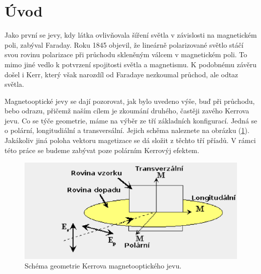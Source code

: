 \chapter*{Úvod}

Jako první se jevy, kdy látka ovlivňovala šíření světla v závislosti na magnetickém poli, zabýval Faraday. Roku 1845 objevil, že lineárně polarizované světlo stáčí svou rovinu polarizace při průchodu skleněným válcem v magnetickém poli. To mimo jiné vedlo k potvrzení spojitosti světla a magnetismu. K podobnému závěru došel i Kerr, který však narozdíl od Faradaye nezkoumal průchod, ale odtaz světla.

Magnetooptické jevy se dají pozorovat, jak bylo uvedeno výše, buď při průchodu, bebo odrazu, přičemž naším cílem je zkoumání druhého, častěji zavého Kerrova jevu. Co se týče geometrie, máme na výběr ze tří základních konfigurací. Jedná se o polární, longitudiální a transversální. Jejich schěma naleznete na obrázku (\ref{schema geo}). Jakákoliv jiná poloha vektoru magetizace se dá složit z těchto tří příadů. V rámci této práce se budeme zabývat poze polárním Kerrovýj efektem.

\begin{figure}
\begin{center}
    \includegraphics[width=5in]{img/polar.eps}
\end{center}
    \caption{Schéma geometrie Kerrova magnetooptického jevu.}
    \label{schema geo}
\end{figure}

